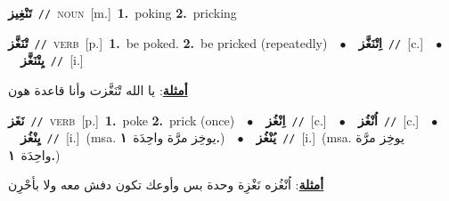 \documentclass[10pt,a4paper,twoside]{article} %
\begin{document}
\begin{multicols}{2}
{\setlength\topsep{0pt}\textbf{\foreignlanguage{arabic}{تَنْغِيز}}\ {\color{gray}\texttt{//}\color{black}}\ \textsc{noun}\ [m.]\ \textbf{1.}~poking  \textbf{2.}~pricking\ } \vspace{2mm}

{\setlength\topsep{0pt}\textbf{\foreignlanguage{arabic}{تْنَغَّز}}\ {\color{gray}\texttt{//}\color{black}}\ \textsc{verb}\ [p.]\ \textbf{1.}~be poked.  \textbf{2.}~be pricked (repeatedly)\ \ $\bullet$\ \ \setlength\topsep{0pt}\textbf{\foreignlanguage{arabic}{اِتْنَغَّز}}\ {\color{gray}\texttt{//}\color{black}}\ [c.]\ \ $\bullet$\ \ \setlength\topsep{0pt}\textbf{\foreignlanguage{arabic}{يِتْنَغَّز}}\ {\color{gray}\texttt{//}\color{black}}\ [i.]\  \begin{flushright}\color{gray}\foreignlanguage{arabic}{\textbf{\underline{\foreignlanguage{arabic}{أمثلة}}}: يا الله تْنَغَّزت وأنا قاعدة هون}\end{flushright}\color{black}} \vspace{2mm}

{\setlength\topsep{0pt}\textbf{\foreignlanguage{arabic}{نَغَز}}\ {\color{gray}\texttt{//}\color{black}}\ \textsc{verb}\ [p.]\ \textbf{1.}~poke  \textbf{2.}~prick (once)\ \ $\bullet$\ \ \setlength\topsep{0pt}\textbf{\foreignlanguage{arabic}{اِنْغُز}}\ {\color{gray}\texttt{//}\color{black}}\ [c.]\ \ $\bullet$\ \ \setlength\topsep{0pt}\textbf{\foreignlanguage{arabic}{اُنْغُز}}\ {\color{gray}\texttt{//}\color{black}}\ [c.]\ \ $\bullet$\ \ \setlength\topsep{0pt}\textbf{\foreignlanguage{arabic}{يِنْغُز}}\ {\color{gray}\texttt{//}\color{black}}\ [i.]\ \color{gray}(msa. \foreignlanguage{arabic}{يوخِز مرَّة واحِدَة}~\foreignlanguage{arabic}{\textbf{١.}})\color{black}\ \ $\bullet$\ \ \setlength\topsep{0pt}\textbf{\foreignlanguage{arabic}{يُنْغُز}}\ {\color{gray}\texttt{//}\color{black}}\ [i.]\ \color{gray}(msa. \foreignlanguage{arabic}{يوخِز مرَّة واحِدَة}~\foreignlanguage{arabic}{\textbf{١.}})\color{black}\  \begin{flushright}\color{gray}\foreignlanguage{arabic}{\textbf{\underline{\foreignlanguage{arabic}{أمثلة}}}: اُنْغُزه نَغْزِة وحدة بس وأوعك تكون دفش معه ولا بأحْرِن}\end{flushright}\color{black}} \vspace{2mm}


\end{multicols}
\end{document}
